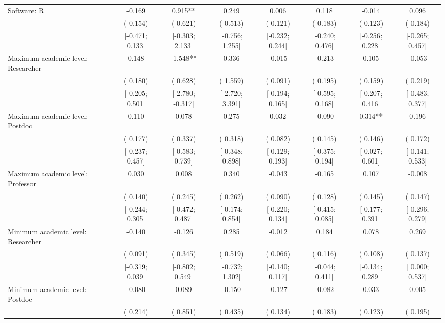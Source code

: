\begin{tabular}{l*{7}{c}}
Software: R & -0.169 &  0.915** &  0.249 &  0.006 &  0.118 & -0.014 &  0.096 \\
                    & ( 0.154) & ( 0.621) & ( 0.513) & ( 0.121) & ( 0.183) & ( 0.123) & ( 0.184) \\
                    & [-0.471;  0.133] & [-0.303;  2.133] & [-0.756;  1.255] & [-0.232;  0.244] & [-0.240;  0.476] & [-0.256;  0.228] & [-0.265;  0.457] \\
Maximum academic level: Researcher &  0.148 & -1.548** &  0.336 & -0.015 & -0.213 &  0.105 & -0.053 \\
                    & ( 0.180) & ( 0.628) & ( 1.559) & ( 0.091) & ( 0.195) & ( 0.159) & ( 0.219) \\
                    & [-0.205;  0.501] & [-2.780; -0.317] & [-2.720;  3.391] & [-0.194;  0.165] & [-0.595;  0.168] & [-0.207;  0.416] & [-0.483;  0.377] \\
Maximum academic level: Postdoc &  0.110 &  0.078 &  0.275 &  0.032 & -0.090 &  0.314** &  0.196 \\
                    & ( 0.177) & ( 0.337) & ( 0.318) & ( 0.082) & ( 0.145) & ( 0.146) & ( 0.172) \\
                    & [-0.237;  0.457] & [-0.583;  0.739] & [-0.348;  0.898] & [-0.129;  0.193] & [-0.375;  0.194] & [ 0.027;  0.601] & [-0.141;  0.533] \\
Maximum academic level: Professor &  0.030 &  0.008 &  0.340 & -0.043 & -0.165 &  0.107 & -0.008 \\
                    & ( 0.140) & ( 0.245) & ( 0.262) & ( 0.090) & ( 0.128) & ( 0.145) & ( 0.147) \\
                    & [-0.244;  0.305] & [-0.472;  0.487] & [-0.174;  0.854] & [-0.220;  0.134] & [-0.415;  0.085] & [-0.177;  0.391] & [-0.296;  0.279] \\
Minimum academic level: Researcher & -0.140 & -0.126 &  0.285 & -0.012 &  0.184 &  0.078 &  0.269 \\
                    & ( 0.091) & ( 0.345) & ( 0.519) & ( 0.066) & ( 0.116) & ( 0.108) & ( 0.137) \\
                    & [-0.319;  0.039] & [-0.802;  0.549] & [-0.732;  1.302] & [-0.140;  0.117] & [-0.044;  0.411] & [-0.134;  0.289] & [ 0.000;  0.537] \\
Minimum academic level: Postdoc & -0.080 &  0.089 & -0.150 & -0.127 & -0.082 &  0.033 &  0.005 \\
                    & ( 0.214) & ( 0.851) & ( 0.435) & ( 0.134) & ( 0.183) & ( 0.123) & ( 0.195) \\

\end{tabular}

